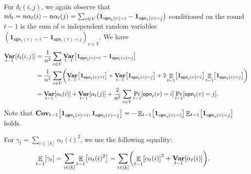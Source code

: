 \documentclass[letterpaper,11pt]{article}
\DeclarePairedDelimiter{\rbra}{\lparen}{\rparen} %
\DeclarePairedDelimiter{\sbra}{\lbrack}{\rbrack} %
\newcommand{\indicator}{\mathbf{1}}
\DeclareMathOperator*{\E}{\mathbb{E}}
\DeclareMathOperator*{\Var}{\mathbf{Var}}
\newcommand{\alphanorm}{\gamma}
\newcommand{\opinion}{\mathsf{opn}}
\begin{document}
%
For $\delta_t(i,j)$, we again observe that $n\delta_t=n\alpha_t(i)-n\alpha_t(j)=\sum_{v\in V}\rbra*{\indicator_{\opinion_t(v)=i}-\indicator_{\opinion_t(v)=j}}$ conditioned on the round $t-1$ is the sum of $n$ independent random variables $(\indicator_{\opinion_t(v)=i}-\indicator_{\opinion_t(v)=j})_{v\in V}$.
We have
\begin{align}
    \Var_{t-1}\sbra*{\delta_t(i,j)}
    &=\frac{1}{n^2}\sum_{v\in V}\Var_{t-1}\sbra*{\indicator_{\opinion_t(v)=i}-\indicator_{\opinion_t(v)=j}} \nonumber \\
    &=\frac{1}{n^2}\sum_{v\in V}\rbra*{\Var_{t-1}\sbra*{\indicator_{\opinion_t(v)=i}}+\Var_{t-1}\sbra*{\indicator_{\opinion_t(v)=j}} +2\E_{t-1}\sbra*{\indicator_{\opinion_t(v)=i}}\E_{t-1}\sbra*{\indicator_{\opinion_t(v)=j}}}\nonumber \\
    &=\Var_{t-1}\sbra*{\alpha_t(i)}+\Var_{t-1}\sbra*{\alpha_t(j)}+\frac{2}{n^2}\sum_{v\in V}\Pr_{t-1}\sbra*{\opinion_t(v)=i}\Pr_{t-1}\sbra*{\opinion_t(v)=j}. \label{eq:variance of delta}
\end{align}
Note that $\mathbf{Cov}_{t-1}\sbra*{\indicator_{\opinion_t(v)=i},\indicator_{\opinion_t(v)=j}}=-\E_{t-1}\sbra*{\indicator_{\opinion_t(v)=i}}\E_{t-1}\sbra*{\indicator_{\opinion_t(v)=j}}$ holds.

For $\alphanorm_t=\sum_{i\in [k]}\alpha_t(i)^2$, we use the following equality:
\begin{align}
    \E_{t-1}\sbra*{\alphanorm_t}
    &=\sum_{i\in [k]}\E_{t-1}\sbra*{\alpha_t(i)^2}
    =\sum_{i\in [k]}\rbra*{\E_{t-1}\sbra*{\alpha_t(i)}^2+\Var_{t-1}\sbra*{\alpha_t(i)}}. \label{eq:expectation of alpha syncnorm}
\end{align}
\end{document}

